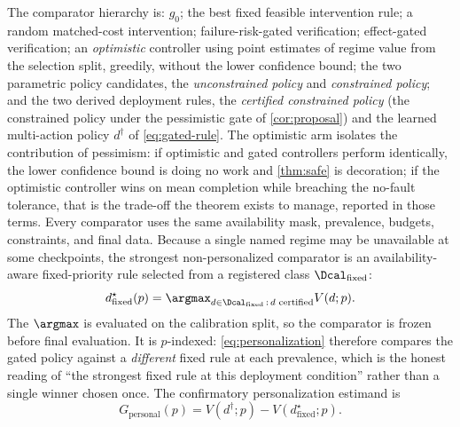 The comparator hierarchy is: $g_0$; the best fixed feasible intervention rule;
a random matched-cost intervention; failure-risk-gated verification;
effect-gated verification; an \emph{optimistic} controller using point estimates
of regime value from the selection split, greedily, without the lower confidence
bound; the two parametric policy candidates, the \emph{unconstrained policy}
and \emph{constrained policy}; and the two derived deployment rules, the
\emph{certified constrained policy} (the constrained policy under
the pessimistic gate of \cref{cor:proposal}) and the learned multi-action policy
$d^\dagger$ of \eqref{eq:gated-rule}.  The optimistic arm isolates the
contribution of pessimism: if optimistic and gated controllers perform
identically, the lower confidence bound is doing no work and \cref{thm:safe} is
decoration; if the optimistic controller wins on mean completion while breaching
the no-fault tolerance, that is the trade-off the theorem exists to manage,
reported in those terms.  Every comparator uses the same availability mask,
prevalence, budgets, constraints, and final data.
Because a single named regime may be unavailable at some checkpoints, the
strongest non-personalized comparator is an availability-aware fixed-priority
rule selected from a registered class $\Dcal_{\mathrm{fixed}}$:
\begin{equation}
 d^\star_{\mathrm{fixed}}(p)
 =\argmax_{d\in\Dcal_{\mathrm{fixed}}\,:\,d\text{ certified}} V(d;p).
\end{equation}
The $\argmax$ is evaluated on the calibration split, so the comparator is frozen
before final evaluation.  It is $p$-indexed: \eqref{eq:personalization}
therefore compares the gated policy against a \emph{different} fixed rule at
each prevalence, which is the honest reading of ``the strongest fixed
rule at this deployment condition'' rather than a single winner chosen once.
The confirmatory personalization estimand is
\begin{equation}
 G_{\mathrm{personal}}(p)
 =V(d^\dagger;p)-V(d^\star_{\mathrm{fixed}};p).
 \label{eq:personalization}
\end{equation}

